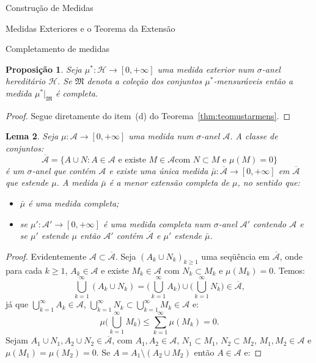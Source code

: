 \documentclass[oneside,final,11pt]{amsbook}
\theoremstyle{remark}\newtheorem{exercise}{Exercício}[chapter]
\theoremstyle{remark}\newtheorem{*exercise}[exercise]{\hbox to 0pt{\hskip 0pt minus 1fil*}Exercício}
\theoremstyle{definition}\newtheorem{exdefin}{Definição}[chapter]
\theoremstyle{plain}\newtheorem{teo}{Teorema}[section]
\theoremstyle{plain}\newtheorem{lem}[teo]{Lema}
\theoremstyle{plain}\newtheorem{prop}[teo]{Proposição}
\theoremstyle{plain}\newtheorem{cor}[teo]{Corolário}
\theoremstyle{definition}\newtheorem{defin}[teo]{Definição}
\theoremstyle{remark}\newtheorem{rem}[teo]{Observação}
\theoremstyle{definition}\newtheorem{notation}[teo]{Notação}
\theoremstyle{definition}\newtheorem{convention}[teo]{Convenção}
\theoremstyle{definition}\newtheorem{example}[teo]{Exemplo}
\numberwithin{section}{chapter}
\numberwithin{equation}{section}
\begin{document}
\begin{chapter}{Construção de Medidas}
\begin{section}{Medidas Exteriores e o Teorema da Extensão}
\begin{subsection}{Completamento de medidas}
\begin{prop}\label{thm:vemdemustarecompl}
Seja $\mu^*:\mathcal H\to[0,+\infty]$ uma medida exterior num $\sigma$-anel hereditário
$\mathcal H$. Se $\mathfrak M$ denota a coleção dos conjuntos $\mu^*$-mensuráveis então
a medida $\mu^*\vert_{\mathfrak M}$ é completa.
\end{prop}
\begin{proof}
Segue diretamente do item~(d) do Teorema~\ref{thm:teomustarmens}.
\end{proof}

\begin{lem}\label{thm:lemacompletar}
Seja $\mu:\mathcal A\to[0,+\infty]$ uma medida num $\sigma$-anel $\mathcal A$.
A classe de conjuntos:
\[\overline{\mathcal A}=\big\{A\cup N:\text{$A\in\mathcal A$ e existe $M\in\mathcal A$
com $N\subset M$ e $\mu(M)=0$}\big\}\]
é um $\sigma$-anel que contém $\mathcal A$ e existe uma única medida $\bar\mu:\overline{\mathcal A}\to[0,+\infty]$
em $\overline{\mathcal A}$ que estende $\mu$. A medida $\bar\mu$ é a {\em menor extensão
completa\/} de $\mu$, no sentido que:
\begin{itemize}
\item $\bar\mu$ é uma medida completa;
\item se $\mu':\mathcal A'\to[0,+\infty]$ é uma medida completa num $\sigma$-anel $\mathcal A'$
contendo $\mathcal A$ e se $\mu'$ estende $\mu$ então $\mathcal A'$ contém $\overline{\mathcal A}$
e $\mu'$ estende $\bar\mu$.
\end{itemize}
\end{lem}
\begin{proof}
Evidentemente $\mathcal A\subset\overline{\mathcal A}$. Seja $(A_k\cup N_k)_{k\ge1}$
uma se\-qüên\-cia em $\overline{\mathcal A}$, onde para cada $k\ge1$,
$A_k\in\mathcal A$ e existe $M_k\in\mathcal A$ com $N_k\subset M_k$ e $\mu(M_k)=0$.
Temos:
\begin{equation}\label{eq:countunbarcalA}
\bigcup_{k=1}^\infty(A_k\cup N_k)=\Big(\bigcup_{k=1}^\infty A_k\Big)\cup
\Big(\bigcup_{k=1}^\infty N_k\Big)\in\overline{\mathcal A},
\end{equation}
já que $\bigcup_{k=1}^\infty A_k\in\mathcal A$, $\bigcup_{k=1}^\infty N_k\subset\bigcup_{k=1}^\infty M_k\in\mathcal A$
e:
\[\mu\Big(\bigcup_{k=1}^\infty M_k\Big)\le\sum_{k=1}^\infty\mu(M_k)=0.\]
Sejam $A_1\cup N_1,A_2\cup N_2\in\overline{\mathcal A}$, com $A_1,A_2\in\mathcal A$,
$N_1\subset M_1$, $N_2\subset M_2$, $M_1,M_2\in\mathcal A$ e $\mu(M_1)=\mu(M_2)=0$.
Se $A=A_1\setminus(A_2\cup M_2)$ então $A\in\mathcal A$ e:

\end{proof}
\end{subsection}
\end{section}
\end{chapter}
\end{document}
